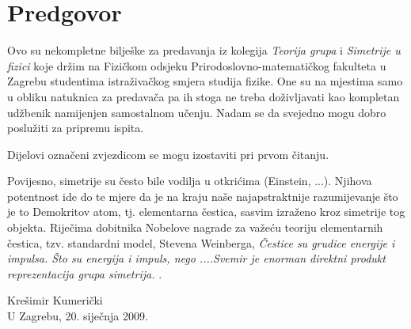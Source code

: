 


\hspace*{10ex}
\section*{Predgovor}

Ovo su nekompletne bilješke za predavanja iz kolegija \emph{Teorija grupa}
i \emph{Simetrije u fizici} koje
držim na Fizičkom odsjeku Prirodoslovno-matematičkog fakulteta u Zagrebu
studentima istraživačkog smjera studija fizike. One su na mjestima samo u obliku
natuknica za predavača pa ih stoga ne
treba doživljavati kao kompletan udžbenik namijenjen samostalnom učenju.
Nadam se da svejedno mogu dobro poslužiti za pripremu ispita.

Dijelovi označeni zvjezdicom se mogu izostaviti pri prvom čitanju.

Povijesno, simetrije su često bile vodilja u otkrićima (Einstein, ...).
Njihova potentnost ide do te mjere da je na kraju naše najapstraktnije
razumijevanje što je to Demokritov atom, tj. elementarna čestica, 
sasvim izraženo kroz simetrije tog objekta. Riječima dobitnika Nobelove
nagrade za važeću teoriju elementarnih čestica, tzv. standardni model,
Stevena Weinberga, \emph{Čestice su grudice energije i impulsa. Što su
    energija i impuls, nego ....Svemir je enorman direktni produkt 
reprezentacija grupa simetrija.} \cite[187]{Crease:1996}.

\begin{flushright}
\begin{minipage}{38ex}
Krešimir Kumerički\\
U Zagrebu, 20. siječnja 2009.
\end{minipage}
\end{flushright}

